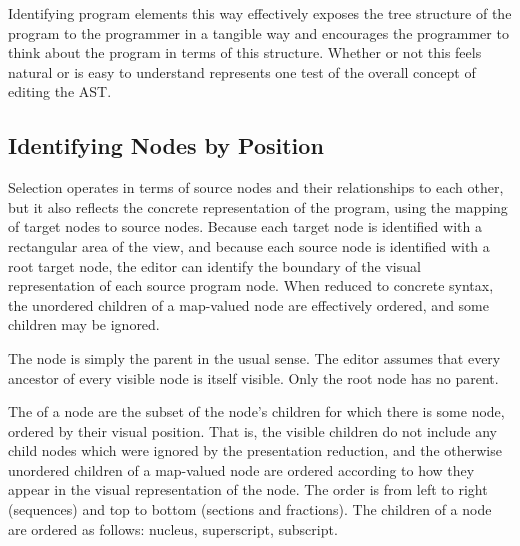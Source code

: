 Identifying program elements this way effectively exposes the tree structure of the program to the programmer in a tangible way and encourages the programmer to think about the program in terms of this structure. Whether or not this feels natural or is easy to understand represents one test of the overall concept of editing the AST.


\subsection{Identifying Nodes by Position}
Selection operates in terms of source nodes and their relationships to each other, but it also reflects the concrete representation of the program, using the mapping of target nodes to source nodes. Because each target node is identified with a rectangular area of the view, and because each source node is identified with a root target node, the editor can identify the boundary of the visual representation of each source program node. When reduced to concrete syntax, the unordered children of a map-valued node are effectively ordered, and some children may be ignored.


The  node is simply the parent in the usual sense. The editor assumes that every ancestor of every visible node is itself visible. Only the root node has no parent.

The  of a node are the subset of the node's children for which there is some  node, ordered by their visual position. That is, the visible children do not include any child nodes which were ignored by the presentation reduction, and the otherwise unordered children of a map-valued node are ordered according to how they appear in the visual representation of the node. The order is from left to right (sequences) and top to bottom (sections and fractions). The children of a  node are ordered as follows: nucleus, superscript, subscript.

